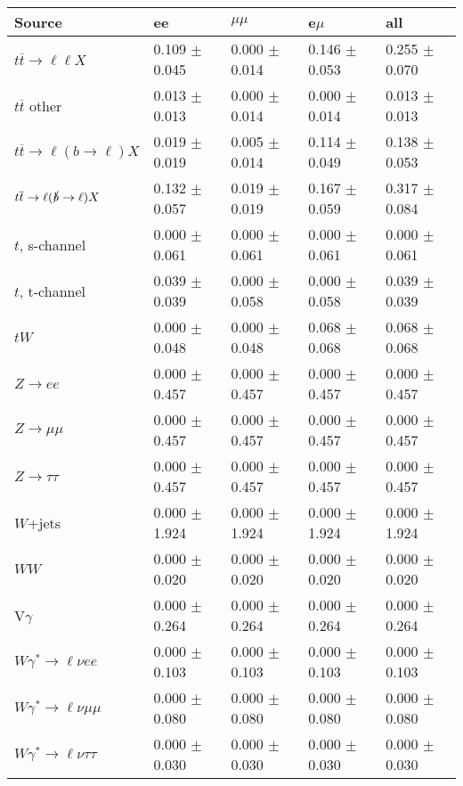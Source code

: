 \begin{tabular}{l | l l l l}
\hline\hline
 Source  &  ee  &  $\mu\mu$  &  e$\mu$  &  all \\
\hline
$t\overline{t}\rightarrow \ell\ell X$ &  0.109 $\pm$  0.045 &  0.000 $\pm$  0.014 &  0.146 $\pm$  0.053 &  0.255 $\pm$  0.070\\
$t\overline{t}$ other &  0.013 $\pm$  0.013 &  0.000 $\pm$  0.014 &  0.000 $\pm$  0.014 &  0.013 $\pm$  0.013\\
$t\overline{t}\rightarrow \ell(b\rightarrow \ell)X$ &  0.019 $\pm$  0.019 &  0.005 $\pm$  0.014 &  0.114 $\pm$  0.049 &  0.138 $\pm$  0.053\\
$t\overline{t}\rightarrow \ell(\slashed{b}\rightarrow \ell)X$ &  0.132 $\pm$  0.057 &  0.019 $\pm$  0.019 &  0.167 $\pm$  0.059 &  0.317 $\pm$  0.084\\
\hline
$t$, s-channel &  0.000 $\pm$  0.061 &  0.000 $\pm$  0.061 &  0.000 $\pm$  0.061 &  0.000 $\pm$  0.061\\
$t$, t-channel &  0.039 $\pm$  0.039 &  0.000 $\pm$  0.058 &  0.000 $\pm$  0.058 &  0.039 $\pm$  0.039\\
$tW$ &  0.000 $\pm$  0.048 &  0.000 $\pm$  0.048 &  0.068 $\pm$  0.068 &  0.068 $\pm$  0.068\\
\hline
$Z\rightarrow ee$ &  0.000 $\pm$  0.457 &  0.000 $\pm$  0.457 &  0.000 $\pm$  0.457 &  0.000 $\pm$  0.457\\
$Z\rightarrow\mu\mu$ &  0.000 $\pm$  0.457 &  0.000 $\pm$  0.457 &  0.000 $\pm$  0.457 &  0.000 $\pm$  0.457\\
$Z\rightarrow\tau\tau$ &  0.000 $\pm$  0.457 &  0.000 $\pm$  0.457 &  0.000 $\pm$  0.457 &  0.000 $\pm$  0.457\\
$W$+jets &  0.000 $\pm$  1.924 &  0.000 $\pm$  1.924 &  0.000 $\pm$  1.924 &  0.000 $\pm$  1.924\\
$WW$ &  0.000 $\pm$  0.020 &  0.000 $\pm$  0.020 &  0.000 $\pm$  0.020 &  0.000 $\pm$  0.020\\
\hline
V$\gamma$ &  0.000 $\pm$  0.264 &  0.000 $\pm$  0.264 &  0.000 $\pm$  0.264 &  0.000 $\pm$  0.264\\
$W\gamma^{*}\rightarrow\ell\nu e e$ &  0.000 $\pm$  0.103 &  0.000 $\pm$  0.103 &  0.000 $\pm$  0.103 &  0.000 $\pm$  0.103\\
$W\gamma^{*}\rightarrow\ell\nu\mu\mu$ &  0.000 $\pm$  0.080 &  0.000 $\pm$  0.080 &  0.000 $\pm$  0.080 &  0.000 $\pm$  0.080\\
$W\gamma^{*}\rightarrow\ell\nu\tau\tau$ &  0.000 $\pm$  0.030 &  0.000 $\pm$  0.030 &  0.000 $\pm$  0.030 &  0.000 $\pm$  0.030\\

\end{tabular}
